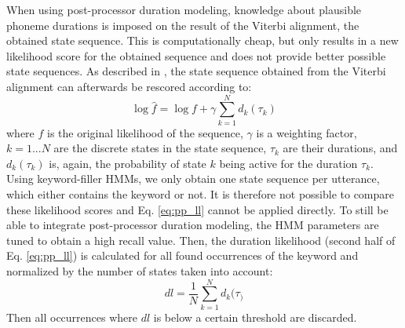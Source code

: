 When using post-processor duration modeling, knowledge about plausible phoneme durations is imposed on the result of the Viterbi alignment, the obtained state sequence. This is computationally cheap, but only results in a new likelihood score for the obtained sequence and does not provide better possible state sequences. As described in \cite{juang}, the state sequence obtained from the Viterbi alignment can afterwards be rescored according to:
\begin{equation} \label{eq:pp_ll}
 \log \hat{f} = \log f + \gamma \sum_{k=1}^{N} d_{k}(\tau_k) 
\end{equation}
where $f$ is the original likelihood of the sequence, $\gamma$ is a weighting factor, $k=1...N$ are the discrete states in the state sequence, $\tau_k$ are their durations, and $d_{k}(\tau_k)$ is, again, the probability of state $k$ being active for the duration $\tau_k$.\\
Using keyword-filler HMMs, we only obtain one state sequence per utterance, which either contains the keyword or not. It is therefore not possible to compare these likelihood scores and Eq. \ref{eq:pp_ll} cannot be applied directly. To still be able to integrate post-processor duration modeling, the HMM parameters are tuned to obtain a high recall value. Then, the duration likelihood (second half of Eq. \ref{eq:pp_ll}) is calculated for all found occurrences of the keyword and normalized by the number of states taken into account:
\begin{equation}
 dl =  \frac{1}{N} \sum_{k=1}^{N} d_{k}(\tau_)
\end{equation}
Then all occurrences where $dl$ is below a certain threshold are discarded.



